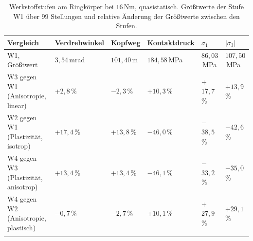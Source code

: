 			\begin{table}[htbp]
				\centering
				\caption{Werkstoffstufen am Ringkörper bei $16$\,Nm, quasistatisch. Größtwerte der Stufe W1 über 99 Stellungen und relative Änderung der Größtwerte zwischen den Stufen.}
				\label{tab:stufen_16nm}
				\footnotesize
				\setlength{\tabcolsep}{4pt}
				\begin{tabular}{L{4.4cm}lllll}
					\hline
					Vergleich                            & Verdrehwinkel & Kopfweg               & Kontaktdruck    & $\sigma_{\mathrm{1}}$ & $|\sigma_{\mathrm{3}}|$ \\
					\hline
					W1, Größtwert                        & $3{,}54$\,mrad & $101{,}40$\,\textmu m & $184{,}58$\,MPa & $86{,}03$\,MPa        & $107{,}50$\,MPa         \\
					\hline
					W3 gegen W1 (Anisotropie, linear)    & +$2{,}8$\,\%   & $-$$2{,}3$\,\%        & +$10{,}3$\,\%   & +$17{,}7$\,\%         & +$13{,}9$\,\%           \\
					\hline
					W2 gegen W1 (Plastizität, isotrop)   & +$17{,}4$\,\%  & +$13{,}8$\,\%         & $-$$46{,}0$\,\% & $-$$38{,}5$\,\%       & $-$$42{,}6$\,\%         \\
					\hline
					W4 gegen W3 (Plastizität, anisotrop) & +$13{,}4$\,\%  & +$13{,}4$\,\%         & $-$$46{,}1$\,\% & $-$$33{,}2$\,\%       & $-$$35{,}0$\,\%         \\
					\hline
					W4 gegen W2 (Anisotropie, plastisch) & $-$$0{,}7$\,\% & $-$$2{,}7$\,\%        & +$10{,}1$\,\%   & +$27{,}9$\,\%         & +$29{,}1$\,\%           \\
					\hline
				\end{tabular}
			\end{table}

